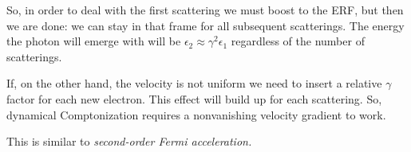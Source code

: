 \documentclass[main.tex]{subfiles}
\begin{document}
So, in order to deal with the first scattering we must boost to the ERF, but then we are done: we can stay in that frame for all subsequent scatterings. 
The energy the photon will emerge with will be \(\epsilon_2 \approx \gamma^2 \epsilon_1 \) regardless of the number of scatterings.

If, on the other hand, the velocity is not uniform we need to insert a relative \(\gamma \) factor for each new electron.
This effect will build up for each scattering. 
So, dynamical Comptonization requires a nonvanishing velocity gradient to work. 


This is similar to \emph{second-order Fermi acceleration.}
\end{document}
